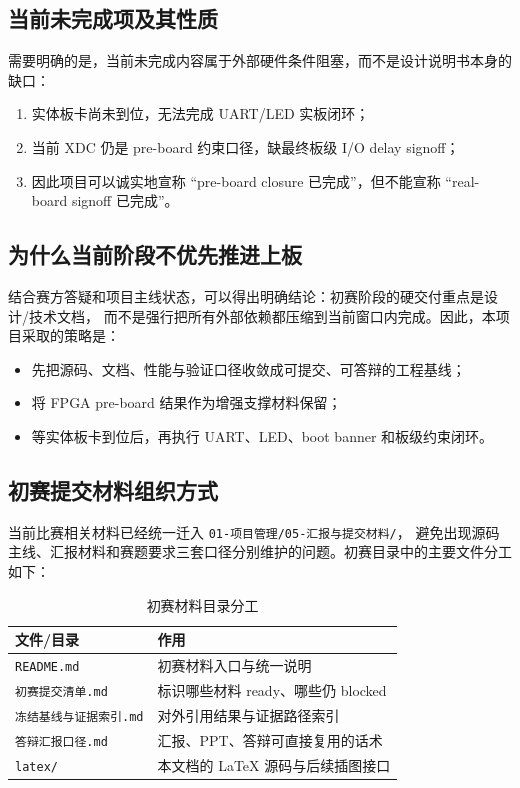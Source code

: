 \subsection{当前未完成项及其性质}

需要明确的是，当前未完成内容属于外部硬件条件阻塞，而不是设计说明书本身的缺口：

\begin{enumerate}
    \item 实体板卡尚未到位，无法完成 UART/LED 实板闭环；
    \item 当前 XDC 仍是 pre-board 约束口径，缺最终板级 I/O delay signoff；
    \item 因此项目可以诚实地宣称 ``pre-board closure 已完成''，但不能宣称
    ``real-board signoff 已完成''。
\end{enumerate}


\subsection{为什么当前阶段不优先推进上板}

结合赛方答疑和项目主线状态，可以得出明确结论：初赛阶段的硬交付重点是设计/技术文档，
而不是强行把所有外部依赖都压缩到当前窗口内完成。因此，本项目采取的策略是：

\begin{itemize}
    \item 先把源码、文档、性能与验证口径收敛成可提交、可答辩的工程基线；
    \item 将 FPGA pre-board 结果作为增强支撑材料保留；
    \item 等实体板卡到位后，再执行 UART、LED、boot banner 和板级约束闭环。
\end{itemize}

\subsection{初赛提交材料组织方式}

当前比赛相关材料已经统一迁入 \texttt{01-项目管理/05-汇报与提交材料/}，
避免出现源码主线、汇报材料和赛题要求三套口径分别维护的问题。初赛目录中的主要文件分工如下：

\begin{table}[H]
    \centering
    \caption{初赛材料目录分工}
    \begin{tabular}{p{} p{}}
        \toprule
        文件/目录 & 作用 \\
        \midrule
        \texttt{README.md} & 初赛材料入口与统一说明 \\
        \texttt{初赛提交清单.md} & 标识哪些材料 ready、哪些仍 blocked \\
        \texttt{冻结基线与证据索引.md} & 对外引用结果与证据路径索引 \\
        \texttt{答辩汇报口径.md} & 汇报、PPT、答辩可直接复用的话术 \\
        \texttt{latex/} & 本文档的 LaTeX 源码与后续插图接口 \\
        \bottomrule
    \end{tabular}
\end{table}


